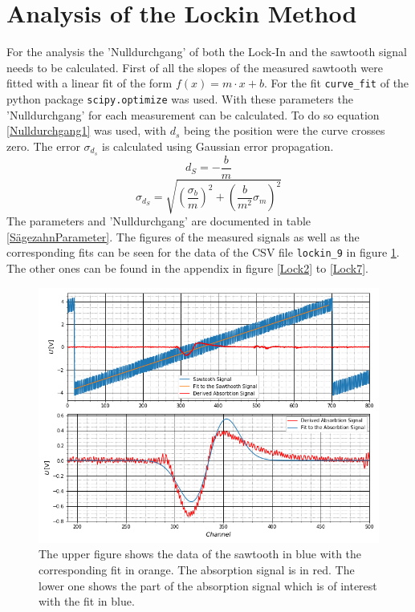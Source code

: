 \section{Analysis of the Lockin Method}
For the analysis the 'Nulldurchgang' of both the Lock-In and the sawtooth signal needs to be calculated. First of all the slopes of the measured sawtooth were fitted with a linear fit of the form $f(x)=m\cdot x+b$. For the fit \verb|curve_fit| of the python package \verb|scipy.optimize| \cite{SciPy_Opti} was used. With these parameters the 'Nulldurchgang' for each measurement can be calculated. To do so equation \ref{Nulldurchgang1} was used, with $d_s$ being the position were the curve crosses zero. The error $\sigma_{d_s}$ is calculated using Gaussian error propagation.
\begin{equation}
	d_S=-\frac{b}{m}
	\label{Nulldurchgang1}
\end{equation}
\begin{equation}
	\sigma_{d_S}=\sqrt{(\frac{\sigma_{b}}{m})^2+(\frac{b}{m^2}\sigma_{m})^2}
\end{equation}
The parameters and 'Nulldurchgang' are documented in table \ref{SägezahnParameter}. The figures of the measured signals as well as the corresponding fits can be seen for the data of the CSV file \verb|lockin_9| in figure \ref{Example}. The other ones can be found in the appendix in figure \ref{Lock2} to \ref{Lock7}.\par
\begin{figure}[h]
	\includegraphics[scale=0.5]{Bild/LockIn8.png}
	\centering
	\caption[Plots and Fits of Lock-In Method 1]{\small The upper figure shows the data of the sawtooth in blue with the corresponding fit in orange. The absorption signal is in red. The lower one shows the part of the absorption signal which is of interest with the fit in blue.}
	\label{Example}
\end{figure}
